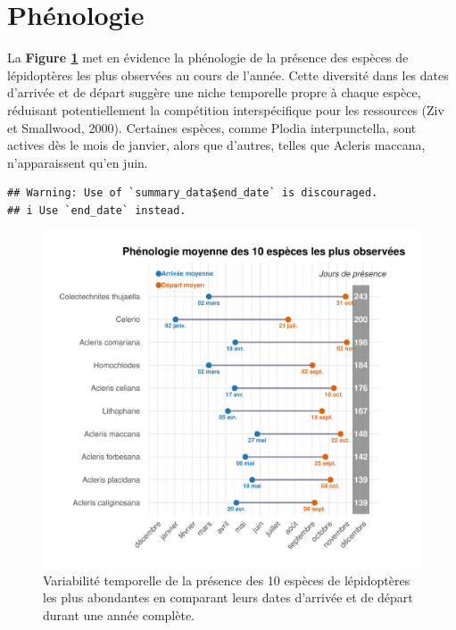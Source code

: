 \documentclass[9pt,twocolumn,twoside,]{pnas-new}
\begin{document}
\section*{Phénologie}\label{phuxe9nologie}

La \textbf{Figure \ref{fig:fig_phenologie}} met en évidence la
phénologie de la présence des espèces de lépidoptères les plus observées
au cours de l'année. Cette diversité dans les dates d'arrivée et de
départ suggère une niche temporelle propre à chaque espèce, réduisant
potentiellement la compétition interspécifique pour les ressources (Ziv
et Smallwood, 2000). Certaines espèces, comme Plodia interpunctella,
sont actives dès le mois de janvier, alors que d'autres, telles que
Acleris maccana, n'apparaissent qu'en juin.

\begin{verbatim}
## Warning: Use of `summary_data$end_date` is discouraged.
## i Use `end_date` instead.
\end{verbatim}

\begin{figure}[H]

{\centering \includegraphics[width=0.8\linewidth]{rapport_final_BIO500_files/figure-latex/fig_phenologie-1} 

}

\caption{\label{fig:fig_phenologie}Variabilité temporelle de la présence des 10 espèces de lépidoptères les plus abondantes en comparant leurs dates d’arrivée et de départ durant une année complète.}\label{fig:fig_phenologie}
\end{figure}
\end{document}
